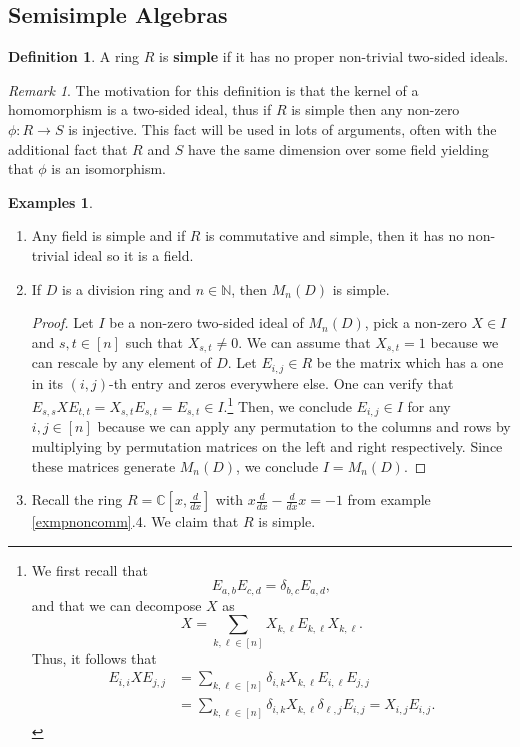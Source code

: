\documentclass{tufte-handout} %
\theoremstyle{definition}
\newtheorem{defn}[thm]{Definition}
\newtheorem{exmps}[thm]{Examples}
\theoremstyle{remark}
\newtheorem{rem}[thm]{Remark}
\newcommand{\N}{\mathbb{N}}
\renewcommand{\C}{\mathbb{C}}
\begin{document}
\subsection{Semisimple Algebras}
\begin{defn}
	A ring $R$ is \textbf{simple} if it has no proper non-trivial two-sided ideals.
\end{defn}
\begin{rem}
	The motivation for this definition is that the kernel of a homomorphism is a two-sided ideal, thus if $R$ is simple then any non-zero $\phi : R\rightarrow S$ is injective. This fact will be used in lots of arguments, often with the additional fact that $R$ and $S$ have the same dimension over some field yielding that $\phi$ is an isomorphism.
\end{rem}
\begin{exmps}\label{exmpsimple}
	\begin{enumerate}
		\item Any field is simple and if $R$ is commutative and simple, then it has no non-trivial ideal so it is a field.
		\item If $D$ is a division ring and $n \in \N$, then $M_n(D)$ is simple.
		\begin{proof}
			Let $I$ be a non-zero two-sided ideal of $M_n(D)$, pick a non-zero $X \in I$ and $s,t \in [n]$ such that $X_{s,t} \neq 0$. We can assume that $X_{s,t} = 1$ because we can rescale by any element of $D$. Let $E_{i,j} \in R$ be the matrix which has a one in its $(i,j)$-th entry and zeros everywhere else. One can verify that $E_{s,s} X E_{t,t} = X_{s,t}E_{s,t} = E_{s,t} \in I$.\footnote{We first recall that \[E_{a,b}E_{c,d} = \delta_{b,c}E_{a,d},\]
			and that we can decompose $X$ as
			\[X = \sum_{k,\ell \in [n]} X_{k,\ell}E_{k,\ell}X_{k,\ell}.\]
			Thus, it follows that
			\begin{align*}
			E_{i,i}XE_{j,j} &= \sum_{k,\ell \in [n]} \delta_{i,k}X_{k,\ell}E_{i,\ell}E_{j,j}\\
			&=\sum_{k,\ell \in [n]} \delta_{i,k}X_{k,\ell}\delta_{\ell, j}E_{i,j} =X_{i,j}E_{i,j}.
			\end{align*}}
			Then, we conclude $E_{i,j} \in I$ for any $i,j \in [n]$ because we can apply any permutation to the columns and rows by multiplying by permutation matrices on the left and right respectively. Since these matrices generate $M_n(D)$, we conclude $I = M_n(D)$.
		\end{proof}
		\item Recall the ring $R = \C[x,\frac{d}{dx}]$ with $x\frac{d}{dx} - \frac{d}{dx}x = -1$ from example \ref{exmpnoncomm}.4. We claim that $R$ is simple.

\end{enumerate}
\end{exmps}
\end{document}
